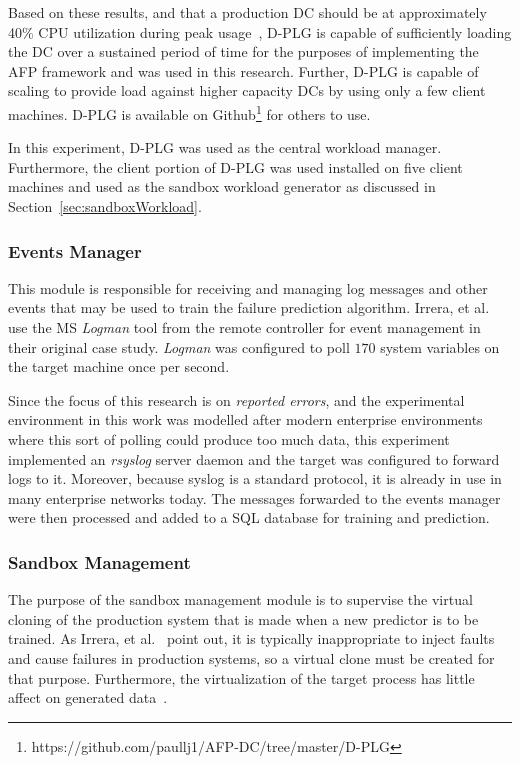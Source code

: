 Based on these results, and that a production \ac{DC} should be at
approximately 40\% \ac{CPU} utilization during peak usage~\cite{mak12},
\ac{D-PLG} is capable of sufficiently loading the \ac{DC} over a sustained
period of time for the purposes of implementing the \ac{AFP} framework and was
used in this research.  Further, \ac{D-PLG} is capable of scaling to provide
load against higher capacity \ac{DC}s by using only a few client machines.
\ac{D-PLG} is available on
Github\footnote{https://github.com/paullj1/AFP-DC/tree/master/D-PLG} for others
to use.

In this experiment, \ac{D-PLG} was used as the central workload manager.
Furthermore, the client portion of \ac{D-PLG} was used installed on five client
machines and used as the sandbox workload generator as discussed in
Section~\ref{sec:sandboxWorkload}.

\subsubsection{Events Manager} \label{sec:eventsManagerMgr}
This module is responsible for receiving and managing log messages and other
events that may be used to train the failure prediction algorithm.  Irrera, et
al.~\cite{irrera2015} use the \ac{MS} \emph{Logman} tool from the remote
controller for event management in their original case study.  \emph{Logman}
was configured to poll $170$ system variables on the target machine once per
second.  

Since the focus of this research is on \emph{reported errors}, and the
experimental environment in this work was modelled after modern enterprise
environments where this sort of polling could produce too much data, this
experiment implemented an \emph{rsyslog} server daemon and the target was
configured to forward logs to it.  Moreover, because syslog is a standard
protocol, it is already in use in many enterprise networks today.  The messages
forwarded to the events manager were then processed and added to a \ac{SQL}
database for training and prediction.  

\subsubsection{Sandbox Management} \label{sec:sandboxMgr} 
The purpose of the sandbox management module is to supervise the virtual
cloning of the production system that is made when a new predictor is to be
trained.  As Irrera, et al.~\cite{irrera2013,irrera2015} point out, it is
typically inappropriate to inject faults and cause failures in production
systems, so a virtual clone must be created for that purpose.  Furthermore, the
virtualization of the target process has little affect on generated
data~\cite{irrera2013}.

